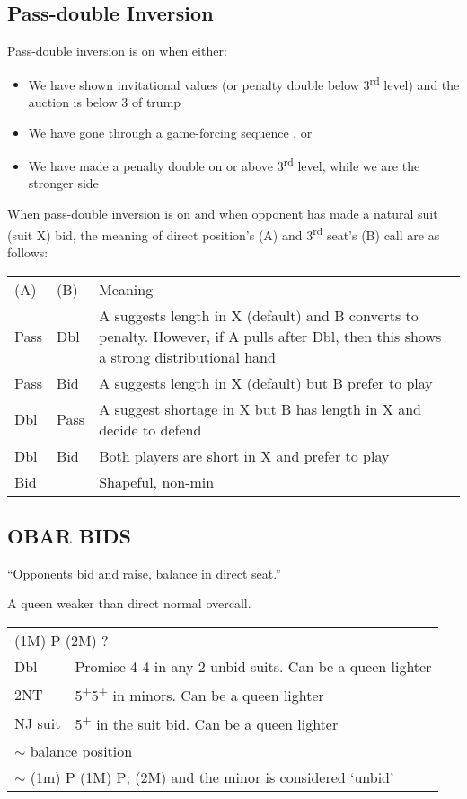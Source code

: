 \documentclass{article}
\newcommand{\nt}{\relsize{-1}NT\relsize{1}}
\newcommand{\up}{\textsuperscript{+}}
\begin{document}
\subsection{Pass-double Inversion}
Pass-double inversion is on when either:
\begin{itemize}
\itemsep0em
	\item We have shown invitational values (or penalty double below 3\textsuperscript{rd} level) and the auction is below 3 of trump
	\item We have gone through a game-forcing sequence , or
	\item We have made a penalty double on or above 3\textsuperscript{rd} level, while we are the stronger side
\end{itemize}
When pass-double inversion is on and when opponent has made a natural suit (suit X) bid, the meaning of direct position's (A) and 3\textsuperscript{rd} seat's (B) call are as follows: \\
\begin{tabular}{|l|l|p{6cm}}
	(A) & (B) & Meaning \\
	Pass & Dbl & A suggests length in X (default) and B converts to penalty. However, if A pulls after Dbl, then this shows a strong distributional hand \\
	Pass & Bid & A suggests length in X (default) but B prefer to play \\
	Dbl & Pass & A suggest shortage in X but B has length in X and decide to defend \\
	Dbl & Bid & Both players are short in X and prefer to play \\
	Bid & & Shapeful, non-min
\end{tabular}

\subsection{OBAR BIDS}

``Opponents bid and raise, balance in direct seat.''

A queen weaker than direct normal overcall.

\medskip

\begin{tabular}{|l|p{6.5cm}}
	\multicolumn{2}{l}{(1M) P (2M) ?} \\
    Dbl & Promise 4-4 in any 2 unbid suits. Can be a queen lighter \\
    2\nt & 5\up{}5\up{} in minors. Can be a queen lighter \\
    NJ suit & 5\up{} in the suit bid. Can be a queen lighter \\
		\multicolumn{2}{l}{$\sim$ balance position} \\
		\multicolumn{2}{l}{$\sim$ (1m) P (1M) P; (2M) and the minor is considered `unbid'}
\end{tabular}
\end{document}
